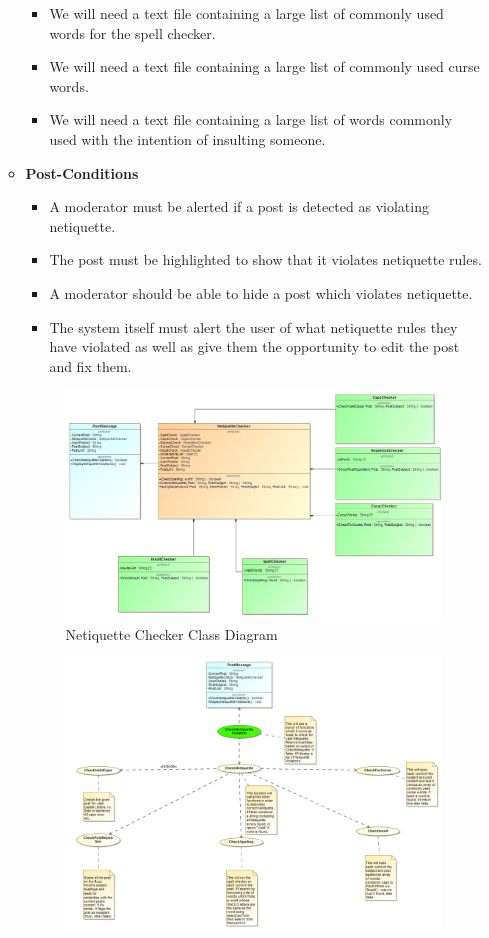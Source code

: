 \documentclass[11pt]{article}
\begin{document}
\begin{enumerate}
\begin{itemize}
\begin{itemize}
	  		\item We will need a text file containing a large list of commonly used words for the spell checker.
	  		\item We will need a text file containing a large list of commonly used curse words.
			\item We will need a text file containing a large list of words commonly used with the intention of insulting someone.
  		\end{itemize}
  	\item	\textbf{Post-Conditions}
  		\begin{itemize}
	  		\item A moderator must be alerted if a post is detected as violating netiquette.
	  		\item The post must be highlighted to show that it violates netiquette rules.
	  		\item A moderator should be able to hide a post which violates netiquette.
	  		\item The system itself must alert the user of what netiquette rules they have violated as well as give them the opportunity to edit the post and fix them.
	  	\end{itemize}
	  		\begin{figure}[H]
	  			\includegraphics[scale=0.35]{NetInputOutput.jpg}
	  			\caption{Netiquette Checker Class Diagram}
	  		\end{figure}
	  		\begin{figure}[H]
	  			\includegraphics[scale=0.35]{NetUseCase.jpg}

\end{figure}
\end{itemize}
\end{enumerate}
\end{document}
